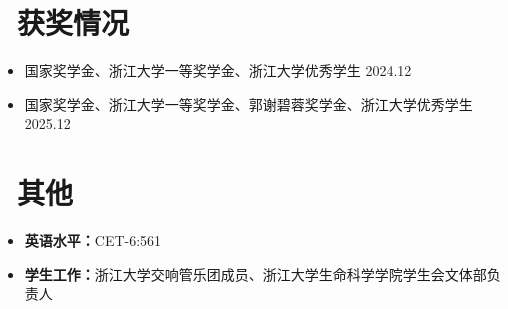 \documentclass[11pt]{article}
\begin{document}
\section{\makebox[\widthof{\faGraduationCap}][c]{\color{CVBlue}\faList}\ 获奖情况}
\begin{itemize}
    \item 国家奖学金、浙江大学一等奖学金、浙江大学优秀学生 \hfill 2024.12
    \item 国家奖学金、浙江大学一等奖学金、郭谢碧蓉奖学金、浙江大学优秀学生 \hfill 2025.12
    
\end{itemize}
    
\section{\makebox[\widthof{\faInfo}][c]{\color{CVBlue}\faInfo}\ 其他}
\begin{itemize}[parsep=0.5ex]
    \item \textbf{英语水平：}CET-6:561
    \item \textbf{学生工作：}浙江大学交响管乐团成员、浙江大学生命科学学院学生会文体部负责人
\end{itemize}
\end{document}
